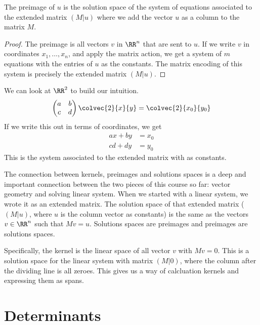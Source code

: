 \documentclass[fleqn]{report}
\begin{document}
\begin{prop}
The preimage of $u$ is the solution space of the system of
equations associated to the extended matrix $(M|u)$ where we
add the vector $u$ as a column to the matrix $M$.
\end{prop}

\begin{proof}
The preimage is all vectors $v$ in $\RR^n$ that are sent to
$u$. If we write $v$ in coordinates $x_1, \ldots, x_n$, and
apply the matrix action, we get a system of $m$ equations with
the entries of $u$ as the constants. The matrix encoding of
this system is precisely the extended matrix $(M|u)$.
\end{proof}

\begin{example}
We can look at $\RR^2$ to build our intuition.
\begin{equation*}
\left( \begin{matrix} a & b \\ c & d \end{matrix} \right)
\colvec{2}{x}{y} = \colvec{2}{x_0}{y_0}
\end{equation*}
If we write this out in terms of coordinates, we get
\begin{align*}
ax + by & = x_0 \\
cd + dy & = y_0 
\end{align*}
This is the system associated to the extended matrix with
 as constants.
\end{example}

The connection between kernels, preimages and solutions spaces
is a deep and important connection between the two pieces of
this course so far: vector geometry and solving linear system.
When we started with a linear system, we wrote it as an
extended matrix. The solution space of that extended matrix
($(M|u)$, where $u$ is the column vector as constants) 
is the same as the vectors $v \in \RR^n$ such that $Mv = u$.
Solutions spaces are preimages and preimages are solutions spaces.

Specifically, the kernel is the linear space of all vector $v$
with $Mv = 0$. This is a solution space for the linear system
with matrix $(M|0)$, where the column after the dividing line
is all zeroes. This gives us a way of calcluation kernels and
expressing them as spans.

\chapter{Determinants}
\label{determinants}
\end{document}
